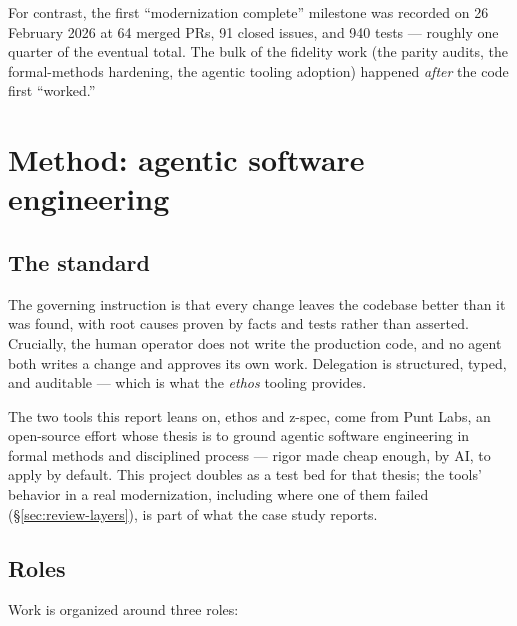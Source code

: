 \documentclass[11pt,a4paper]{article}
\begin{document}
For contrast, the first ``modernization complete'' milestone was recorded
on 26 February 2026 at 64 merged PRs, 91 closed issues, and 940 tests ---
roughly one quarter of the eventual total. The bulk of the fidelity work
(the parity audits, the formal-methods hardening, the agentic tooling
adoption) happened \emph{after} the code first ``worked.''

\section{Method: agentic software engineering}

\subsection{The standard}

The governing instruction is that every change leaves the codebase better
than it was found, with root causes proven by facts and tests rather than
asserted. Crucially, the human operator does not write the production code,
and no agent both writes a change and approves its own work. Delegation is
structured, typed, and auditable --- which is what the \emph{ethos} tooling
provides.

The two tools this report leans on, ethos and z-spec, come from Punt Labs, an
open-source effort whose thesis is to ground agentic software engineering in
formal methods and disciplined process --- rigor made cheap enough, by AI, to
apply by default. This project doubles as a test bed for that thesis; the
tools' behavior in a real modernization, including where one of them failed
(\S\ref{sec:review-layers}), is part of what the case study reports.

\subsection{Roles}

Work is organized around three roles:
\end{document}

